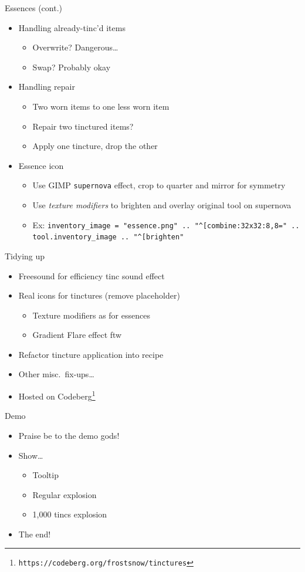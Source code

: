 \documentclass{beamer}
\begin{document}
\begin{frame}[fragile]{Essences (cont.)}
\begin{itemize}
	\item Handling already-tinc'd items
	\begin{itemize}
		\item Overwrite?  Dangerous\ldots
		\item Swap?  Probably okay
	\end{itemize}
	\item Handling repair
	\begin{itemize}
		\item Two worn items to one less worn item
		\item Repair two tinctured items?
		\item Apply one tincture, drop the other
	\end{itemize}
	\item Essence icon
	\begin{itemize}
		\item Use GIMP \texttt{supernova} effect, crop to quarter and mirror for symmetry
		\item Use \emph{texture modifiers} to brighten and overlay original tool on supernova
		\item Ex: \tiny\verb-inventory_image = "essence.png" .. "^[combine:32x32:8,8=" ..- \\
			\verb-tool.inventory_image .. "^[brighten"-
	\end{itemize}
\end{itemize}
\end{frame}

\begin{frame}{Tidying up}
\begin{itemize}
	\item Freesound for efficiency tinc sound effect
	\item Real icons for tinctures (remove placeholder)
	\begin{itemize}
		\item Texture modifiers as for essences
		\item Gradient Flare effect ftw
	\end{itemize}
	\item Refactor tincture application into recipe
	\item Other misc.~fix-ups\ldots
	\item Hosted on Codeberg\footnote{\texttt{https://codeberg.org/frostsnow/tinctures}}
\end{itemize}
\end{frame}

\begin{frame}{Demo}
\begin{itemize}
	\item Praise be to the demo gods!
	\item Show\ldots
	\begin{itemize}
		\item Tooltip
		\item Regular explosion
		\item 1,000 tincs explosion
	\end{itemize}
	\item The end!
\end{itemize}
\end{frame}
\end{document}
